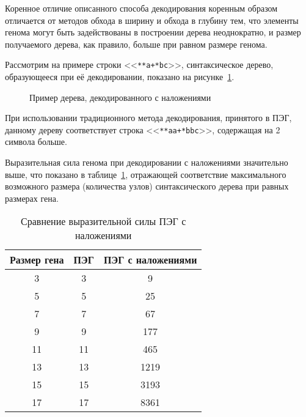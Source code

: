 Коренное отличие описанного способа декодирования коренным образом отличается от методов обхода в ширину и обхода в глубину тем, что элементы генома могут быть задействованы в построении дерева неоднократно, и размер получаемого дерева, как правило, больше при равном размере генома.

Рассмотрим на примере строки <<\verb|**a+*bc|>>, синтаксическое дерево, образующееся при её декодировании, показано на рисунке~\ref{img:GEP_ET_sample_EAOGE}.

\begin{figure} [h]
  \center
  \caption{Пример дерева, декодированного с наложениями}
  \label{img:GEP_ET_sample_EAOGE}
\end{figure}

При использовании традиционного метода декодирования, принятого в ПЭГ, данному дереву соответствует строка <<\verb|**aa+*bbc|>>, содержащая на 2 символа больше.

Выразительная сила генома при декодировании с наложениями значительно выше, что показано в таблице~\ref{tbl:EAOGE_expression_power}, отражающей соответствие максимального возможного размера (количества узлов) синтаксического дерева при равных размерах гена.

\begin{table}[h]
  \caption{Сравнение выразительной силы ПЭГ с наложениями}
  \label{tbl:EAOGE_expression_power}
  \begin{center}
    \begin{tabular}{|c|c|c|}
      \hline
      Размер гена & ПЭГ & ПЭГ с наложениями \\
      \hline
      3 & 3 & 9 \\
      5 & 5 & 25 \\
      7 & 7 & 67 \\
      9 & 9 & 177 \\
      11 & 11 & 465 \\
      13 & 13 & 1219 \\
      15 & 15 & 3193 \\
      17 & 17 & 8361 \\
      \hline
    \end{tabular}
  \end{center}
\end{table}

